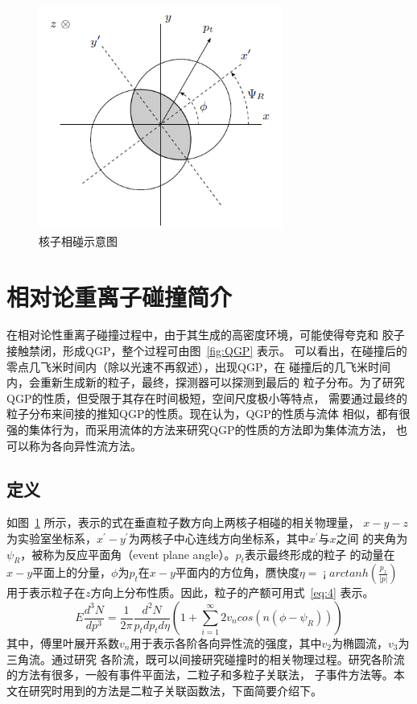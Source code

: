 \documentclass[aps,pre,12pt,preprint,onecolumn,showpacs,showkeys]{revtex4-1}
\begin{document}
\begin{figure}[htbp]
\centering
\includegraphics[width=80mm]{hz}
\caption{\label{fig:hz}%
核子相碰示意图}
\end{figure}
\section{相对论重离子碰撞简介}
在相对论性重离子碰撞过程中，由于其生成的高密度环境，可能使得夸克和
胶子接触禁闭，形成QGP，整个过程可由图~\ref{fig:QGP} 表示\cite{2013PhDT........31Q}。
可以看出，在碰撞后的零点几飞米时间内（除以光速不再叙述），出现QGP，在
碰撞后的几飞米时间内，会重新生成新的粒子，最终，探测器可以探测到最后的
粒子分布。为了研究QGP的性质，但受限于其存在时间极短，空间尺度极小等特点，
需要通过最终的粒子分布来间接的推知QGP的性质。现在认为，QGP的性质与流体
相似，都有很强的集体行为，而采用流体的方法来研究QGP的性质的方法即为集体流方法，
也可以称为各向异性流方法\cite{2010LanB...23..240H}。
\subsection{定义}
如图~\ref{fig:hz} 所示，表示的式在垂直粒子数方向上两核子相碰的相关物理量，
$x-y-z$为实验室坐标系，$x^{'}-y^{'}$为两核子中心连线方向坐标系，其中$x^{'}$与$x$之间
的夹角为$\psi_{R}$，被称为反应平面角（event plane angle）。$p_{t}$表示最终形成的粒子
的动量在$x-y$平面上的分量，$\phi$为$p_{t}$在$x-y$平面内的方位角，赝快度$\eta=\operatorname¡{arctanh}(\frac{p_{z}}{|p|})$
用于表示粒子在$z$方向上分布性质。因此，粒子的产额可用式~\ref{eq:4} 表示\cite{PhysRevC.58.1671}。
\begin{equation}
E\frac{d^{3}N}{dp^{3}}=\frac{1}{2\pi}\frac{d^{2}N}{p_{t}dp_{t}d\eta}(1+\sum_{i=1}^{\infty}2v_{n}cos(n(\phi-\psi_{R}))) \label{eq:4}
\end{equation}
其中，傅里叶展开系数$v_{n}$用于表示各阶各向异性流的强度，其中$v_{2}$为椭圆流，$v_{3}$为三角流。通过研究
各阶流，既可以间接研究碰撞时的相关物理过程。研究各阶流的方法有很多，一般有事件平面法，二粒子和多粒子关联法，
子事件方法等。本文在研究时用到的方法是二粒子关联函数法，下面简要介绍下。
\end{document}
